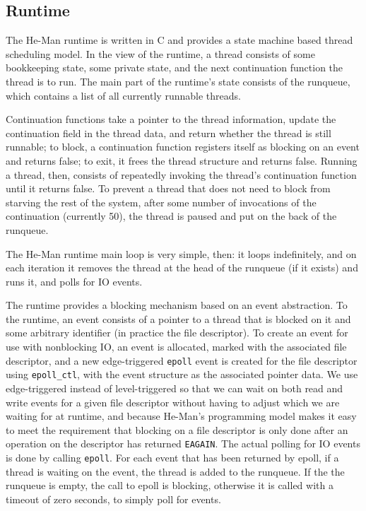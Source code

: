 \documentclass[preprint,11pt]{sigplanconf}
\renewcommand{\t}{\texttt}
\begin{document}
\subsection{Runtime}

The He-Man runtime is written in C and provides a state machine based
thread scheduling model. In the view of the runtime, a thread consists
of some bookkeeping state, some private state, and the next
continuation function the thread is to run. The main part of the
runtime's state consists of the runqueue, which contains a list of all
currently runnable threads.

Continuation functions take a pointer to the thread information,
update the continuation field in the thread data, and return whether
the thread is still runnable; to block, a continuation function
registers itself as blocking on an event and returns false; to exit,
it frees the thread structure and returns false.
Running a thread, then, consists of repeatedly invoking the thread's
continuation function until it returns false. To prevent a
thread that does not need to block from starving the rest of the
system, after some number of invocations of the continuation
(currently 50), the thread is paused and put on the back of the
runqueue.

The He-Man runtime main loop is very simple, then: it loops
indefinitely, and on each iteration it removes the thread at the head
of the runqueue (if it exists) and runs it, and polls for IO events.

The runtime provides a blocking mechanism based on an event
abstraction. To the runtime, an event consists of a pointer to a
thread that is blocked on it and some arbitrary identifier (in
practice the file descriptor). To create an event for use with
nonblocking IO, an event is allocated, marked with the associated file
descriptor, and a new edge-triggered \t{epoll} event is created for the
file descriptor using \t{epoll\_ctl}, with the event structure as the
associated pointer data.
We use edge-triggered instead of level-triggered so that we can wait
on both read and write events for a given file descriptor without
having to adjust which we are waiting for at runtime, and because
He-Man's programming model makes it easy to meet the requirement that
blocking on a file descriptor is only done after an operation on the
descriptor has returned \t{EAGAIN}.
The actual polling for IO events is done by calling \t{epoll}. For each
event that has been returned by epoll, if a thread is waiting on the
event, the thread is added to the runqueue. If the the runqueue is
empty, the call to epoll is blocking, otherwise it is called with a
timeout of zero seconds, to simply poll for events.
\end{document}
